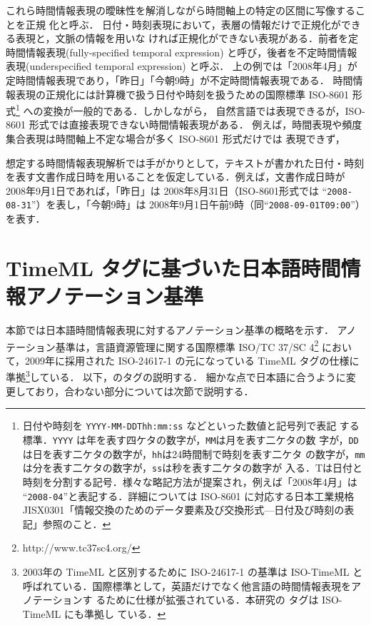 \documentclass[japanese]{jnlp_1.4}
\newcommand{\modified}[1]{}
\def\timexiii{}
\begin{document}
これら時間情報表現の曖昧性を解消しながら時間軸上の特定の区間に写像することを正規
化と呼ぶ．
日付・時刻表現において，表層の情報だけで正規化ができる表現と，文脈の情報を用いな
ければ正規化ができない表現がある．前者を定時間情報表現(fully-specified temporal expression) と呼び，後者を不定時間情報表現(underspecified temporal expression) と呼ぶ．
上の例では「2008年4月」が定時間情報表現であり，「昨日」「今朝9時」が不定時間情報表現である．
時間情報表現の正規化には計算機で扱う日付や時刻を扱うための国際標準 ISO-8601 形式\footnote{日付や時刻を {\tt YYYY-MM-DDThh:mm:ss} などといった数値と記号列で表記
  する標準．{\tt YYYY} は年を表す四ケタの数字が，{\tt MM}は月を表す二ケタの数
  字が，{\tt DD}は日を表す二ケタの数字が，{\tt hh}は24時間制で時刻を表す二ケタ
  の数字が，{\tt mm}は分を表す二ケタの数字が，{\tt ss}は秒を表す二ケタの数字が
  入る．Tは日付と時刻を分割する記号．様々な略記方法が提案され，例えば「2008年4月」は ``{\tt 2008-04}''と表記する．詳細については ISO-8601 に対応する日本工業規格 JISX0301「情報交換のためのデータ要素及び交換形式—日付及び時刻の表記」参照のこと．}
への変換が一般的である．しかしながら，
自然言語では表現できるが，ISO-8601 形式では直接表現できない時間情報表現がある．
  例えば，時間表現や頻度集合表現は時間軸上不定な場合が多く ISO-8601 形式だけでは
  表現できず，\modified{TimeMLの \timexiii においてさまざまな拡張形式が提案され
  ている．}

想定する時間情報表現解析では手がかりとして，テキストが書かれた日付・時刻を表す文書作成日時を用いることを仮定している．例えば，文書作成日時が 2008年9月1日であれば，「昨日」は 2008年8月31日（ISO-8601形式では ``{\tt 2008-08-31}''）を表し，「今朝9時」は 2008年9月1日午前9時（同``{\tt 2008-09-01T09:00}''）を表す．


\section{TimeML \timexiii タグに基づいた日本語時間情報アノテーション基準}

本節では日本語時間情報表現に対するアノテーション基準の概略を示す．
アノテーション基準は，言語資源管理に関する国際標準 ISO/TC 37/SC
4\footnote{http://www.tc37sc4.org/} において，2009年に採用された
ISO-24617-1 の元になっている TimeML \cite{TimeML} \timexiii タグの仕様に準拠\footnote{2003年の TimeML と区別するために ISO-24617-1 の基準は ISO-TimeML
と呼ばれている．国際標準として，英語だけでなく他言語の時間情報表現をアノテーションす
るために仕様が拡張されている．本研究の \timexiii タグは ISO-TimeML にも準拠し
ている．}している．
以下，\timexiii のタグの\modified{日本語適応について}説明する．
細かな点で日本語に合うように変更しており，合わない部分については次節で説明する．
\end{document}

